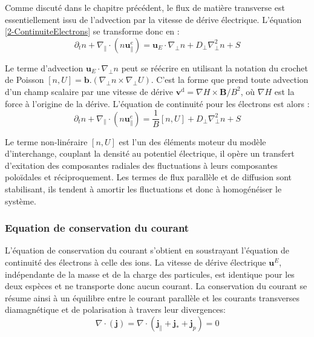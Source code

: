 Comme discuté dans le chapitre précédent, le flux de matière transverse est
essentiellement issu de l'advection par la vitesse de
dérive électrique. L'équation \ref{2-ContinuiteElectrons} se transforme donc en :
\begin{equation}
\label{2-ContinuiteElectrons2}
\partial_t n + \nabla_{\parallel}\cdot(n\mathbf{u}^e_{\parallel}) =
\mathbf{u}_E\cdot\nabla_\perp n + D_\perp\nabla^2_\perp n + S
\end{equation}

Le terme d'advection $\mathbf{u}_E\cdot\nabla_\perp
n$ peut se réécrire en utilisant la notation
du crochet de Poisson $[n,U]=\mathbf{b}.(\nabla_\perp n\times\nabla_\perp U)$.
C'est la forme que prend toute advection d'un champ scalaire par une vitesse de
dérive $\mathbf{v}^\text{d}=\nabla H\times\mathbf{B}/B^2$, où $\nabla H$ est la
force à l'origine de la dérive. L'équation de continuité pour les électrons est
alors :
\begin{equation}
\partial_t n + \nabla_{\parallel}\cdot(n\mathbf{u}^e_{\parallel}) =
\frac{1}{B}\left[n,U\right] + D_\perp\nabla^2_\perp n + S
\end{equation}

Le terme non-linéraire $[n,U]$ est l'un des éléments moteur du modèle
d'interchange, couplant la densité au potentiel électrique, il opère un
transfert d'exitation des composantes radiales des fluctuations à leurs
composantes poloïdales et réciproquement. Les termes de flux parallèle et de
diffusion sont stabilisant, ils tendent à
amortir les fluctuations et donc à homogénéiser le système.

\subsubsection{Equation de conservation du courant}
L'équation de conservation du courant s'obtient en soustrayant l'équation de
continuité des électrons à celle des ions. La vitesse de dérive électrique
$\mathbf{u}^E$, indépendante de la masse et de la charge des particules, est
identique pour les deux espèces et ne transporte donc aucun courant. 
La conservation du courant se résume ainsi à un équilibre entre le courant
parallèle et les courants transverses diamagnétique et de polarisation à
travers leur divergences:
\begin{equation}
\label{EqCourant1}
\nabla\cdot\left(\mathbf{j}\right) = 
\nabla\cdot\left(\mathbf{j}_\parallel+\mathbf{j}_*+\mathbf{j}_p\right)
= 0
\end{equation}

